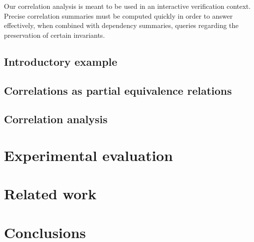 \documentclass[11pt]{article}
\begin{document}
Our correlation analysis is meant to be used in an interactive verification 
context. Precise correlation summaries must be computed quickly in order to 
answer effectively, when combined with dependency summaries, queries 
regarding the preservation of certain invariants. 


\subsection{Introductory example}

\subsection{Correlations as partial equivalence relations}

\subsection{Correlation analysis}

\section{Experimental evaluation}

\section{Related work}

\section{Conclusions}



\end{document}
